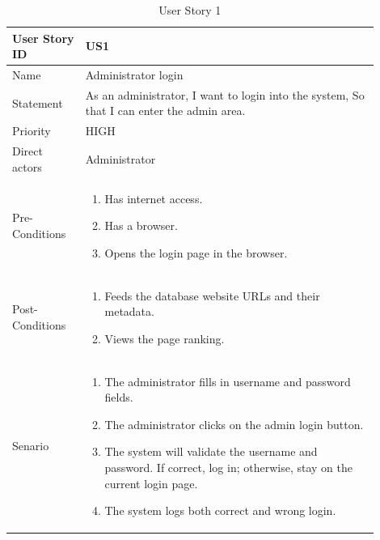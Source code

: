 \documentclass{scrartcl}
\begin{document}
\begin{table}[H]
  \caption{User Story 1}
  \begin{tabular}{p{0.18\linewidth} | p{0.72\linewidth}}
    \toprule
    User Story ID & US1
    \\\midrule
    Name & Administrator login
    \\\hline
    Statement & As an administrator, I want to login into the system, So that I can enter the admin area.
    \\\hline
    Priority & HIGH
    \\\hline
    Direct actors & Administrator
    \\\hline
    Pre-Conditions & {
                     \begin{enumerate}
                     \item Has internet access.
                     \item Has a browser.
                     \item Opens the login page in the browser.
                     \end{enumerate}
                     }\vspace*{-\baselineskip}
    \\\hline
    Post-Conditions & {
                      \begin{enumerate}
                      \item Feeds the database website URLs and their metadata.
                      \item Views the page ranking.
                      \end{enumerate}
                      }\vspace*{-\baselineskip}
    \\\hline
    Senario & {
              \begin{enumerate}
              \item The administrator fills in username and password fields.
              \item The administrator clicks on the admin login button.
              \item The system will validate the username and password. If correct, log in; otherwise, stay on the current login page.
              \item The system logs both correct and wrong login.
              \end{enumerate}
              }\vspace*{-\baselineskip}
    \\\bottomrule
  \end{tabular}
\end{table}
\end{document}
